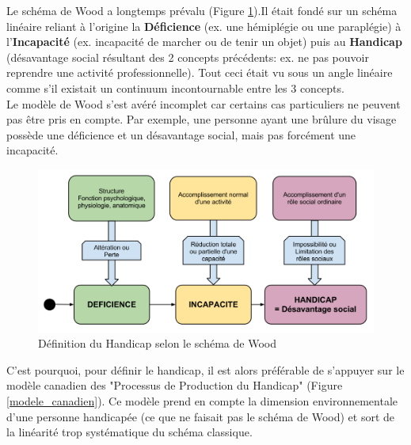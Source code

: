 Le schéma de Wood a longtemps prévalu (Figure \ref{schema_wood}).Il était fondé sur un schéma linéaire reliant à l'origine la \textbf{Déficience} (ex. une hémiplégie ou une paraplégie) à l'\textbf{Incapacité} (ex. incapacité de marcher ou de tenir un objet) puis au \textbf{Handicap} (désavantage social résultant des 2 concepts précédents: ex. ne pas pouvoir reprendre une activité professionnelle). Tout ceci était vu sous un angle linéaire comme s'il existait un continuum incontournable entre les 3 concepts. \\

Le modèle de Wood s'est avéré incomplet car certains cas particuliers ne peuvent pas être pris en compte. Par exemple, une personne ayant une brûlure du visage possède une déficience et un désavantage social, mais pas forcément une incapacité.\\

\begin{figure}
\centering
\includegraphics[scale=0.45]{figures/schema_wood.png}
\caption{Définition du Handicap selon le schéma de Wood}
\label{schema_wood}
\end{figure}

C'est pourquoi, pour définir le handicap, il est alors préférable de s'appuyer sur le modèle canadien des "Processus de Production du Handicap" (Figure \ref{modele_canadien}). Ce modèle prend en compte la dimension environnementale d'une personne handicapée (ce que ne faisait pas le schéma de Wood) et sort de la linéarité trop systématique du schéma classique.~\cite{pphFougeyrollas}~\cite{socialConsequences}


